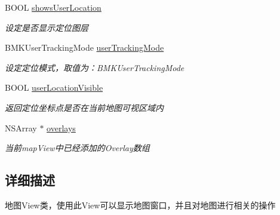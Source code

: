 \begin{DoxyCompactItemize}
\item 
\hypertarget{interface_b_m_k_map_view_a6e18e9532c42e940eca7739378348af4}{}B\+O\+O\+L \hyperlink{interface_b_m_k_map_view_a6e18e9532c42e940eca7739378348af4}{shows\+User\+Location}\label{interface_b_m_k_map_view_a6e18e9532c42e940eca7739378348af4}

\begin{DoxyCompactList}\small\item\em 设定是否显示定位图层 \end{DoxyCompactList}\item 
\hypertarget{interface_b_m_k_map_view_aac0adfff30441312452cef6844ef818b}{}B\+M\+K\+User\+Tracking\+Mode \hyperlink{interface_b_m_k_map_view_aac0adfff30441312452cef6844ef818b}{user\+Tracking\+Mode}\label{interface_b_m_k_map_view_aac0adfff30441312452cef6844ef818b}

\begin{DoxyCompactList}\small\item\em 设定定位模式，取值为：\+B\+M\+K\+User\+Tracking\+Mode \end{DoxyCompactList}\item 
\hypertarget{interface_b_m_k_map_view_ada9feb9e53eb9611b57a596c572bb280}{}B\+O\+O\+L \hyperlink{interface_b_m_k_map_view_ada9feb9e53eb9611b57a596c572bb280}{user\+Location\+Visible}\label{interface_b_m_k_map_view_ada9feb9e53eb9611b57a596c572bb280}

\begin{DoxyCompactList}\small\item\em 返回定位坐标点是否在当前地图可视区域内 \end{DoxyCompactList}\item 
\hypertarget{interface_b_m_k_map_view_a6c673c46ad9f146f80e48d82ebcf934b}{}N\+S\+Array $\ast$ \hyperlink{interface_b_m_k_map_view_a6c673c46ad9f146f80e48d82ebcf934b}{overlays}\label{interface_b_m_k_map_view_a6c673c46ad9f146f80e48d82ebcf934b}

\begin{DoxyCompactList}\small\item\em 当前map\+View中已经添加的\+Overlay数组 \end{DoxyCompactList}\end{DoxyCompactItemize}


\subsection{详细描述}
地图\+View类，使用此\+View可以显示地图窗口，并且对地图进行相关的操作 

